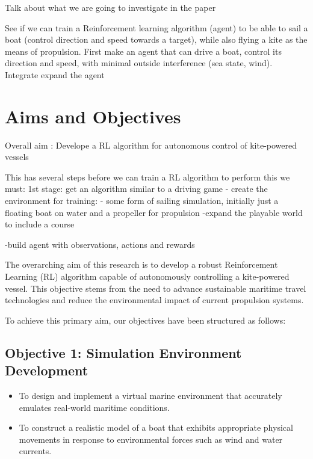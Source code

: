 Talk about what we are going to investigate in the paper

See if we can train a Reinforcement learning algorithm (agent) to be able to sail a boat (control direction and speed towards a target), while also flying a kite as the means of propulsion. 
First make an agent that can drive a boat, control its direction and speed, with minimal outside interference (sea state, wind).
Integrate expand the agent  






\section{Aims and Objectives}

Overall aim : Develope a RL algorithm for autonomous control of kite-powered vessels



This has several steps before we can train a RL algorithm to perform this we must:
1st stage: get an algorithm similar to a driving game
- create the environment for training:
    - some form of sailing simulation, initially just a floating boat on water and a propeller for propulsion
-expand the playable world to include a course

-build agent with observations, actions and rewards

The overarching aim of this research is to develop a robust Reinforcement Learning (RL) algorithm capable of autonomously controlling a kite-powered vessel. This objective stems from the need to advance sustainable maritime travel technologies and reduce the environmental impact of current propulsion systems.

To achieve this primary aim, our objectives have been structured as follows:

\subsection*{Objective 1: Simulation Environment Development}
\begin{itemize}
    \item To design and implement a virtual marine environment that accurately emulates real-world maritime conditions.
    \item To construct a realistic model of a boat that exhibits appropriate physical movements in response to environmental forces such as wind and water currents.
\end{itemize}

